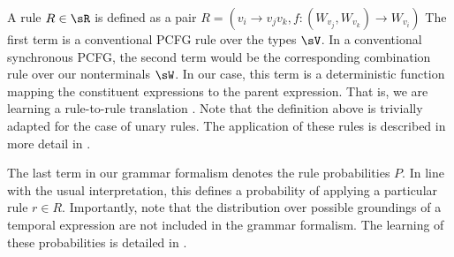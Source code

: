 A rule $R \in \sR$ is defined as a pair 
	$R = \left(v_i \rightarrow v_jv_k, 
		f : (W_{v_j},W_{v_k}) \rightarrow W_{v_i}\right)$
The first term is a conventional PCFG rule over the types
	$\sV$.
In a conventional synchronous PCFG, the second term would be the corresponding
	combination rule over our nonterminals $\sW$.
In our case, this term is a deterministic function mapping the
	constituent expressions to the parent expression.
That is, we are learning a rule-to-rule translation 
	\cite{key:1976bach-semantics}.
Note that the definition above is trivially adapted for the case of unary
	rules.
The application of these rules is described in more detail in 
	.

The last term in our grammar formalism denotes the rule probabilities $P$.
In line with the usual interpretation, this defines a probability
	of applying a particular rule $r \in R$.
Importantly, note that the distribution over possible groundings
	of a temporal expression are not included in the grammar
	formalism.
The learning of these probabilities is detailed in .




